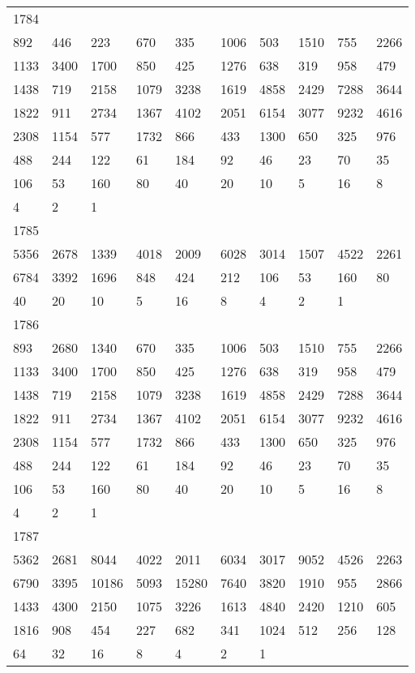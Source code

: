 \begin{longtable}{*{10}{l}}
1784&&&&&&&&&\\
892& 446& 223& 670& 335& 1006& 503& 1510& 755& 2266\\
1133& 3400& 1700& 850& 425& 1276& 638& 319& 958& 479\\
1438& 719& 2158& 1079& 3238& 1619& 4858& 2429& 7288& 3644\\
1822& 911& 2734& 1367& 4102& 2051& 6154& 3077& 9232& 4616\\
2308& 1154& 577& 1732& 866& 433& 1300& 650& 325& 976\\
488& 244& 122& 61& 184& 92& 46& 23& 70& 35\\
106& 53& 160& 80& 40& 20& 10& 5& 16& 8\\
4& 2& 1& \\

1785&&&&&&&&&\\
5356& 2678& 1339& 4018& 2009& 6028& 3014& 1507& 4522& 2261\\
6784& 3392& 1696& 848& 424& 212& 106& 53& 160& 80\\
40& 20& 10& 5& 16& 8& 4& 2& 1& \\

1786&&&&&&&&&\\
893& 2680& 1340& 670& 335& 1006& 503& 1510& 755& 2266\\
1133& 3400& 1700& 850& 425& 1276& 638& 319& 958& 479\\
1438& 719& 2158& 1079& 3238& 1619& 4858& 2429& 7288& 3644\\
1822& 911& 2734& 1367& 4102& 2051& 6154& 3077& 9232& 4616\\
2308& 1154& 577& 1732& 866& 433& 1300& 650& 325& 976\\
488& 244& 122& 61& 184& 92& 46& 23& 70& 35\\
106& 53& 160& 80& 40& 20& 10& 5& 16& 8\\
4& 2& 1& \\

1787&&&&&&&&&\\
5362& 2681& 8044& 4022& 2011& 6034& 3017& 9052& 4526& 2263\\
6790& 3395& 10186& 5093& 15280& 7640& 3820& 1910& 955& 2866\\
1433& 4300& 2150& 1075& 3226& 1613& 4840& 2420& 1210& 605\\
1816& 908& 454& 227& 682& 341& 1024& 512& 256& 128\\
64& 32& 16& 8& 4& 2& 1& \\


\end{longtable}
